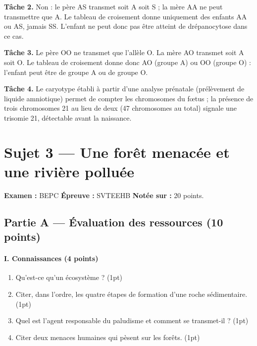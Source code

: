 \textbf{Tâche 2.} Non : le père AS transmet soit A soit S ; la mère AA ne peut
transmettre que A. Le tableau de croisement donne uniquement des enfants AA ou AS,
jamais SS. L'enfant ne peut donc pas être atteint de drépanocytose dans ce cas.

\textbf{Tâche 3.} Le père OO ne transmet que l'allèle O. La mère AO transmet soit A
soit O. Le tableau de croisement donne donc AO (groupe A) ou OO (groupe O) : l'enfant
peut être de groupe A ou de groupe O.

\textbf{Tâche 4.} Le caryotype établi à partir d'une analyse prénatale (prélèvement
de liquide amniotique) permet de compter les chromosomes du fœtus ; la présence de
trois chromosomes 21 au lieu de deux (47 chromosomes au total) signale une trisomie
21, détectable avant la naissance.

\section{Sujet 3 — Une forêt menacée et une rivière polluée}

\noindent\textbf{Examen :} BEPC \quad\textbf{Épreuve :} SVTEEHB \quad\textbf{Notée
sur :} 20 points.

\subsection*{Partie A — Évaluation des ressources (10 points)}

\paragraph{I. Connaissances (4 points)}
\begin{enumerate}[label=\arabic*)]
\item Qu'est-ce qu'un écosystème ? \hfill (1pt)
\item Citer, dans l'ordre, les quatre étapes de formation d'une roche sédimentaire.
\hfill (1pt)
\item Quel est l'agent responsable du paludisme et comment se transmet-il ? \hfill
(1pt)
\item Citer deux menaces humaines qui pèsent sur les forêts. \hfill (1pt)
\end{enumerate}

